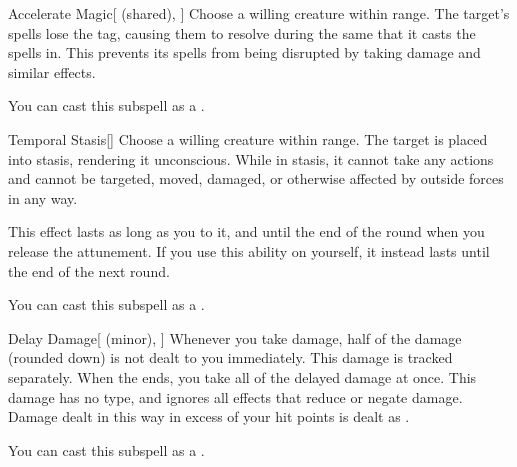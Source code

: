 \begin{ability}[\nth{3}]{Accelerate Magic}[ (shared), ]
Choose a willing creature within \rngmed range.
The target's spells lose the  tag, causing them to resolve during the same that it casts the spells in.
This prevents its spells from being disrupted by taking damage and similar effects.

You can cast this subspell as a .
\end{ability}
\vspace{0.25em}


\begin{ability}[\nth{3}]{Temporal Stasis}[]
Choose a willing creature within \rngclose range.
The target is placed into stasis, rendering it unconscious.
While in stasis, it cannot take any actions and cannot be targeted, moved, damaged, or otherwise affected by outside forces in any way.

This effect lasts as long as you  to it, and until the end of the round when you release the attunement.
If you use this ability on yourself, it instead lasts until the end of the next round.

You can cast this subspell as a .
\end{ability}
\vspace{0.25em}


\begin{ability}[\nth{4}]{Delay Damage}[ (minor), ]
Whenever you take damage, half of the damage (rounded down) is not dealt to you immediately.
This damage is tracked separately.
When the ends, you take all of the delayed damage at once.
This damage has no type, and ignores all effects that reduce or negate damage.
Damage dealt in this way in excess of your hit points is dealt as .

You can cast this subspell as a .
\end{ability}
\vspace{0.25em}


